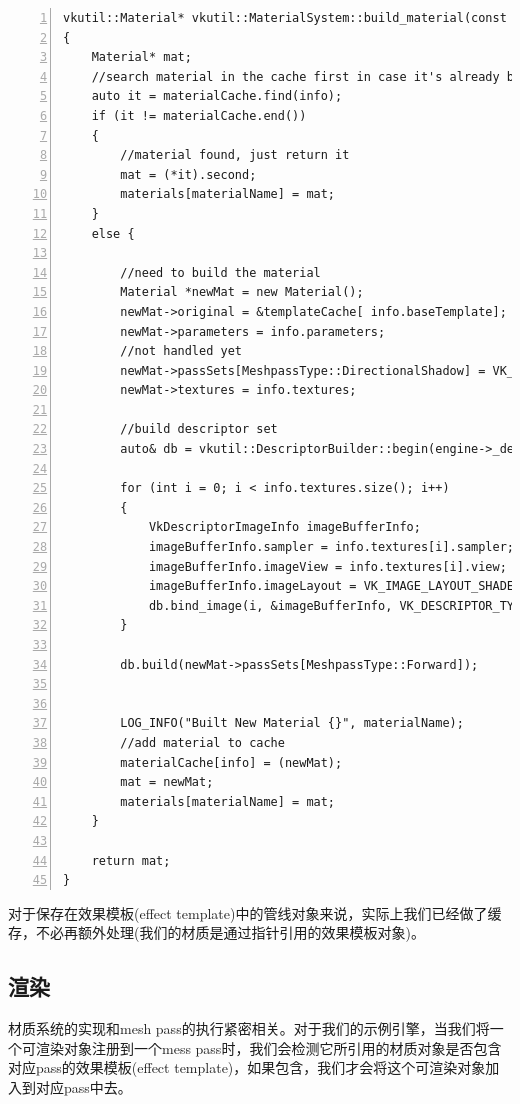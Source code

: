 \documentclass{ctexart}
\begin{document}
\begin{lstlisting}[language={[ANSI]C},keywordstyle=\color{blue!70},commentstyle=\color{red!50!green!50!blue!50},frame=shadowbox, rulesepcolor=\color{red!20!green!20!blue!20},basicstyle=\small,numbers=left, numberstyle=\tiny,breaklines=true]
vkutil::Material* vkutil::MaterialSystem::build_material(const std::string& materialName, const MaterialData& info)
{
	Material* mat;
	//search material in the cache first in case it's already built
	auto it = materialCache.find(info);
	if (it != materialCache.end())
	{
		//material found, just return it
		mat = (*it).second;
		materials[materialName] = mat;
	}
	else {

		//need to build the material
		Material *newMat = new Material();
		newMat->original = &templateCache[ info.baseTemplate];
		newMat->parameters = info.parameters;
		//not handled yet
		newMat->passSets[MeshpassType::DirectionalShadow] = VK_NULL_HANDLE;
		newMat->textures = info.textures;

		//build descriptor set
		auto& db = vkutil::DescriptorBuilder::begin(engine->_descriptorLayoutCache, engine->_descriptorAllocator);

		for (int i = 0; i < info.textures.size(); i++)
		{
			VkDescriptorImageInfo imageBufferInfo;
			imageBufferInfo.sampler = info.textures[i].sampler;
			imageBufferInfo.imageView = info.textures[i].view;
			imageBufferInfo.imageLayout = VK_IMAGE_LAYOUT_SHADER_READ_ONLY_OPTIMAL;
			db.bind_image(i, &imageBufferInfo, VK_DESCRIPTOR_TYPE_COMBINED_IMAGE_SAMPLER, VK_SHADER_STAGE_FRAGMENT_BIT);
		}

		db.build(newMat->passSets[MeshpassType::Forward]);


		LOG_INFO("Built New Material {}", materialName);
		//add material to cache
		materialCache[info] = (newMat);
		mat = newMat;
		materials[materialName] = mat;
	}

	return mat;
}
\end{lstlisting}

对于保存在效果模板(effect template)中的管线对象来说，实际上我们已经做了缓存，不必再额外处理(我们的材质是通过指针引用的效果模板对象)。

\subsection{渲染}

材质系统的实现和mesh pass的执行紧密相关。对于我们的示例引擎，当我们将一个可渲染对象注册到一个mess pass时，我们会检测它所引用的材质对象是否包含对应pass的效果模板(effect template)，如果包含，我们才会将这个可渲染对象加入到对应pass中去。
\end{document}
